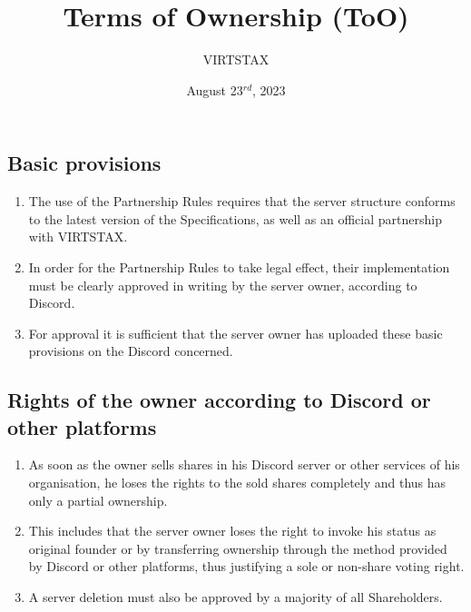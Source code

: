 \documentclass{article}
\title{Terms of Ownership (ToO)}
\author{VIRTSTAX}
\date{August 23$^{rd}$, 2023}
\begin{document}
\maketitle
\newpage
\tableofcontents
\newpage
\subsection{Basic provisions}
\begin{enumerate}[(1)]
	\item The use of the Partnership Rules requires that the server structure conforms to the latest version of the Specifications, as well as an official partnership with VIRTSTAX.\@
	\item In order for the Partnership Rules to take legal effect, their implementation must be clearly approved in writing by the server owner, according to Discord.
	\item For approval it is sufficient that the server owner has uploaded these basic provisions on the Discord concerned.
\end{enumerate}

\subsection{Rights of the owner according to Discord or other platforms}
\begin{enumerate}[(1)]
	\item As soon as the owner sells shares in his Discord server or other services of his organisation, he loses the rights to the sold shares completely and thus has only a partial ownership.
	\item This includes that the server owner loses the right to invoke his status as original founder or by transferring ownership through the method provided by Discord or other platforms, thus justifying a sole or non-share voting right.
	\item A server deletion must also be approved by a majority of all Shareholders.
\end{enumerate}
\end{document}
